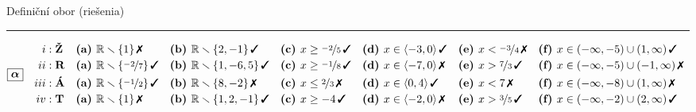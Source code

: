 \documentclass[10pt]{report}
\begin{document}
\begin{landscape}
\begin{center}
{\huge Definiční obor (riešenia)}\\[4mm]
\begin{varwidth}{\linewidth}
\begin{center}
\footnotesize
\rule[1mm]{\linewidth}{0.5pt}
$\boxed{\bm{\alpha}} \quad \begin{aligned}
\romannumeral1 : \; &\textbf{Ž} 
 &&\mathrm{\textbf{(a) }} \mathbb{R}\smallsetminus\{1\}\,\text{\ding{55}}
 &&\mathrm{\textbf{(b) }} \mathbb{R}\smallsetminus\{2,-1\}\,\text{\ding{51}}
 &&\mathrm{\textbf{(c) }} x\geq\nicefrac{-2}{5}\,\text{\ding{51}}
 &&\mathrm{\textbf{(d) }} x\in\langle-3 , 0\rangle\,\text{\ding{51}}
 &&\mathrm{\textbf{(e) }} x<\nicefrac{-3}{4}\,\text{\ding{55}}
 &&\mathrm{\textbf{(f) }} x\in(-\infty , -5)\cup(1 , \infty)\,\text{\ding{51}}
\\[-0.2mm]
\romannumeral2 : \; &\textbf{R} 
 &&\mathrm{\textbf{(a) }} \mathbb{R}\smallsetminus\{\nicefrac{-2}{7}\}\,\text{\ding{51}}
 &&\mathrm{\textbf{(b) }} \mathbb{R}\smallsetminus\{1,-6,5\}\,\text{\ding{51}}
 &&\mathrm{\textbf{(c) }} x\geq\nicefrac{-1}{8}\,\text{\ding{51}}
 &&\mathrm{\textbf{(d) }} x\in\langle-7 , 0\rangle\,\text{\ding{55}}
 &&\mathrm{\textbf{(e) }} x>\nicefrac{7}{3}\,\text{\ding{51}}
 &&\mathrm{\textbf{(f) }} x\in(-\infty , -5)\cup(-1 , \infty)\,\text{\ding{55}}
\\[-0.2mm]
\romannumeral3 : \; &\textbf{Á} 
 &&\mathrm{\textbf{(a) }} \mathbb{R}\smallsetminus\{\nicefrac{-1}{2}\}\,\text{\ding{51}}
 &&\mathrm{\textbf{(b) }} \mathbb{R}\smallsetminus\{8,-2\}\,\text{\ding{55}}
 &&\mathrm{\textbf{(c) }} x\leq\nicefrac{2}{3}\,\text{\ding{55}}
 &&\mathrm{\textbf{(d) }} x\in\langle0 , 4\rangle\,\text{\ding{51}}
 &&\mathrm{\textbf{(e) }} x<7\,\text{\ding{55}}
 &&\mathrm{\textbf{(f) }} x\in(-\infty , -8)\cup(1 , \infty)\,\text{\ding{55}}
\\[-0.2mm]
\romannumeral4 : \; &\textbf{T} 
 &&\mathrm{\textbf{(a) }} \mathbb{R}\smallsetminus\{1\}\,\text{\ding{55}}
 &&\mathrm{\textbf{(b) }} \mathbb{R}\smallsetminus\{1,2,-1\}\,\text{\ding{51}}
 &&\mathrm{\textbf{(c) }} x\geq-4\,\text{\ding{51}}
 &&\mathrm{\textbf{(d) }} x\in\langle-2 , 0\rangle\,\text{\ding{55}}
 &&\mathrm{\textbf{(e) }} x>\nicefrac{3}{5}\,\text{\ding{51}}
 &&\mathrm{\textbf{(f) }} x\in(-\infty , -2)\cup(2 , \infty)\,\text{\ding{51}}
\end{aligned} $
\\[2.6mm]

\end{center}
\end{varwidth}
\end{center}
\end{landscape}
\end{document}
